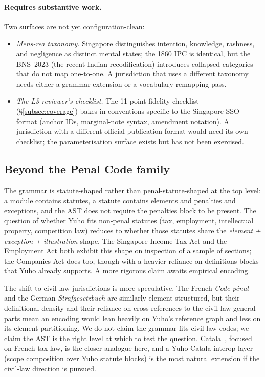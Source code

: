 \paragraph{Requires substantive work.} Two surfaces are not yet
configuration-clean:

\begin{itemize}
\item \emph{Mens-rea taxonomy.} Singapore distinguishes intention,
knowledge, rashness, and negligence as distinct mental states; the
1860 IPC is identical, but the BNS~2023 (the recent Indian
recodification) introduces collapsed categories that do not map
one-to-one. A jurisdiction that uses a different taxonomy needs
either a grammar extension or a vocabulary remapping pass.
\item \emph{The L3 reviewer's checklist.} The 11-point fidelity
checklist (\S\ref{subsec:coverage}) bakes in conventions specific to
the Singapore SSO format (anchor IDs, marginal-note syntax,
amendment notation). A jurisdiction with a different official
publication format would need its own checklist; the
parameterisation surface exists but has not been exercised.
\end{itemize}

\subsection{Beyond the Penal Code family}
\label{subsec:non_penal}

The grammar is statute-shaped rather than penal-statute-shaped at the
top level: a module contains statutes, a statute contains elements
and penalties and exceptions, and the AST does not require the
penalties block to be present. The question of whether Yuho fits
non-penal statutes (tax, employment, intellectual property,
competition law) reduces to whether those statutes share the
\emph{element + exception + illustration} shape. The Singapore
Income Tax Act and the Employment Act both exhibit this shape on
inspection of a sample of sections; the Companies Act does too,
though with a heavier reliance on definitions blocks that Yuho
already supports. A more rigorous claim awaits empirical encoding.

The shift to civil-law jurisdictions is more speculative. The French
\emph{Code p\'enal} and the German \emph{Strafgesetzbuch} are
similarly element-structured, but their definitional density and
their reliance on cross-references to the civil-law general parts
mean an encoding would lean heavily on Yuho's reference graph and
less on its element partitioning. We do not claim the grammar fits
civil-law codes; we claim the AST is the right level at which to
test the question. Catala~\cite{catala2021}, focused on French tax
law, is the closer analogue here, and a Yuho-Catala interop layer
(scope composition over Yuho statute blocks) is the most natural
extension if the civil-law direction is pursued.

